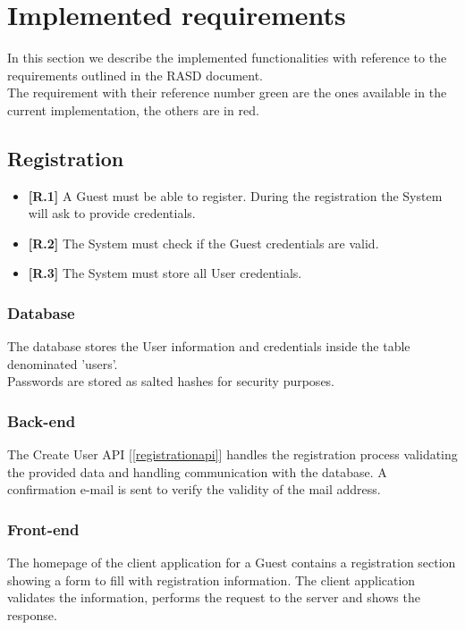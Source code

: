 \section{Implemented requirements}

In this section we describe the implemented functionalities with reference to the requirements outlined in the RASD document.\\
The requirement with their reference number green are the ones available in the current implementation, the others are in red.

\subsection{Registration}
\begin{itemize}
	\item {\color{OliveGreen}\textbf{[R.1]}} A Guest must be able to register. During the registration the System will ask to provide credentials.
	\item {\color{OliveGreen}\textbf{[R.2]}} The System must check if the Guest credentials are valid.
	\item {\color{OliveGreen}\textbf{[R.3]}} The System must store all User credentials.
\end{itemize}
\subsubsection*{Database}
The database stores the User information and credentials inside the table denominated 'users'.\\
Passwords are stored as salted hashes for security purposes.

\subsubsection*{Back-end}
The Create User API [\ref{registrationapi}] handles the registration process validating the provided data and handling communication with the database. A confirmation e-mail is sent to verify the validity of the mail address. 

\subsubsection*{Front-end}
The homepage of the client application for a Guest contains a registration section showing a form to fill with registration information. The client application validates the information, performs the request to the server and shows the response.


